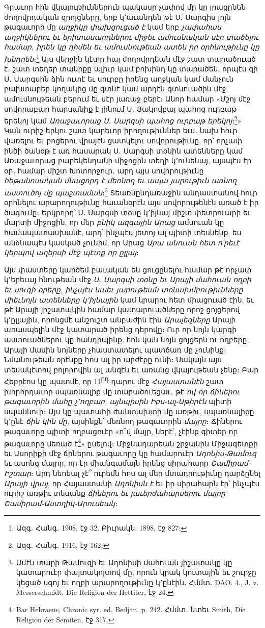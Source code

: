 \documentclass{article}
\begin{document}
{Գրաւոր հին վկայութիւններուն պակասը չափով մը կը լրացընեն ժողովրդական զրոյցները, երբ կ՚աւանդեն թէ Ս․ Սարգիս յոյն թագաւորի մը \emph{աղջիկը փախցուցած է} կամ երբ \emph{չափահաս աղջիկներու եւ երիտասարդներու միջեւ ամուսնական սէր տածելու համար, իրեն կը դիմեն եւ ամուսնութեան ատեն իր օրհնութիւնը կը խնդրեն}։\footnote{Ազգ․ Հանգ․ 1908, էջ 32. Բիւրակն, 1898, էջ 827։} Այս վերջին կէտը հայ ժողովրդեան մէջ շատ տարածուած է․ շատ տեղեր տանիքը ալիւր կամ բոխինդ կը տարածեն, որպէս զի Ս․ Սարգսին ձին ուտէ եւ սուրբը իրենց աղջկան կամ մանչուն բախտաբեր կողակից մը գտնէ կամ արդէն գտնուածին մէջ ամուսնութեան բերում եւ սէր յառաջ բերէ։ Անոր համար «Մշոյ մէջ սովորաբար հարսանիք է լինում Ս․ Յակովբալ պահոց ուրբաթ երեկոյ կամ \emph{Առաջաւորաց Ս․ Սարզսի պահոց ուրբաթ երեկոյ}։\footnote{Ազգ․ Հանգ․ 1916, էջ 162։}» Կան ուրիշ երկու շատ կարեւոր իրողութիւններ եւս․ նախ հուր վառելու եւ բոցերու վրայէն ցատկելու սովորութիւնը, որ՝ որչափ ինծի ծանօթ է առ հասարակ Ս․ Սարգսի տօնին ատենները կամ Առաջաւորաց բարեկենդանի միջոցին տեղի կ՚ունենայ, այսպէս էր օր․ համար միշտ Խոտորջուր․ արդ այս սովորութիւնը \emph{հեթանոսական մնացորդ է մեռնող եւ ապա յարութիւն առնող աստուծոյ մը պաշտաման}։\footnote{Ամէն տարի Թամուզի եւ Ադոնիսի մահուան յիշատակը կը կատարուէր փայտակոյտով մը, որուն կրակ կուտային եւ շուրջը կեցած սգոյ եւ ողբի արարողութիւնը կ՚ընէին․ Հմմտ․ DAO. 4., J. v. Messerschmidt, Die Religion der Hettiter, էջ 24.} Տեառնընդառաջին անդաստանով հուր օրհնելու արարողութիւնը հաւանօրէն այս սովորութենէն առած է իր ծագումը։ Երկրորդ՝ Ս․ Սարգսի տօնը կ՚իյնայ միշտ փետրուարի եւ մարտի միջոցին, որ մեր \emph{բնիկ ազգային Արաց} ամսուան կը համապատասխանէ, արդ՝ ինչպէս յետոյ ալ պիտի տեսնենք, ես անձնապէս կասկած չունիմ, որ Արաց \emph{Արա անուան հետ ո՛րեւէ կերպով աղերսի մէջ պէտք որ ըլլայ}։

Այս փաստերը կարծեմ բաւական են ցուցընելու համար թէ որչափ կ՚երեւայ հնութեան մէջ \emph{Ս․ Սարգսի տօնը եւ Արայի մահուան ողբի եւ սուգի օրերը, ինչպէս նաեւ յարութեան տօնախմբութիւնները միեւնոյն ատենները կ՚իյնային} կամ կրարու հետ միացուած էին, եւ թէ Արայի յիշատակին համար կատարուածները որոշ ցոյցերով կ՚ըլլային, որոնցմէ անշուշտ անբաժին էին \emph{Արալեզները} Արայի առասպելին մէջ կատարած իրենց դերովը։ Ուր որ նոյն կարգի աստուածներու կը հանդիպինք, հոն կան նոյն ցոյցերն ու ողբերը, Արայի մասին նոյները չհաստատելու պատճառ մը չունինք։ Նմանութեան օրէնքը հոս ալ իր արժէքը ունի։ Սակայն այս տեսակէտով բոլորովին ալ անզէն եւ առանց վկայութեան չենք։ Բար Հեբրէոս կը պատմէ, որ 11\textsuperscript{րդ} դարու մէջ \emph{Հայաստանէն} շատ խորհրդաւոր սպառնալիք մը տարածուեցաւ, թէ \emph{ով որ ճիներու թագաւորին մահը չ՚ողբար, այնպիսին Իբս֊ալ֊Աթիրէն} պիտի սպաննուի։ Այս կը պատահի ժանտախտի մը առթիւ, սպառնալիքը կ՚ընէ \emph{ճին կին մը}, այսինքն՝ մեռնող թագաւորին \emph{մայրը}։ Ճիներու թագաւորը պիտի ողբացուէր «ո՜վ մայր, ներէ՛, չէինք գիտեր որ թագաւորը մեռած է\footnote{Bar Hebraeus, Chronic syr. ed. Bedjan, p. 242. Հմմտ․ նտեւ Smith, Die Religion der Semiten, էջ 317.}» ըսելով։ Միջնադարեան շրջանին Միջագետքի եւ Ասորիքի մէջ ճիներու թագաւորը կը համարուէր \emph{Ադոնիս֊Թամուզ} եւ ասոնց մայրը, որ էր միանգամայն իրենց սիրահարը \emph{Շամիրամ֊Իշտար}։ Արդ նեոեալ չէ՞ ուրեմն հոս ալ մեր մտադրութիւնը դարձընել \emph{Արայի վրայ}, որ Հայաստանի \emph{Ադոնիսն է} եւ իր սիրահարն էր՝ ինչպէս ուրիշ առթիւ տեսանք \emph{ճիներու եւ յաւերժահարսերու մայրը Շամիրամ֊Աստղիկ֊Արուսեակ}։

}
\end{document}

